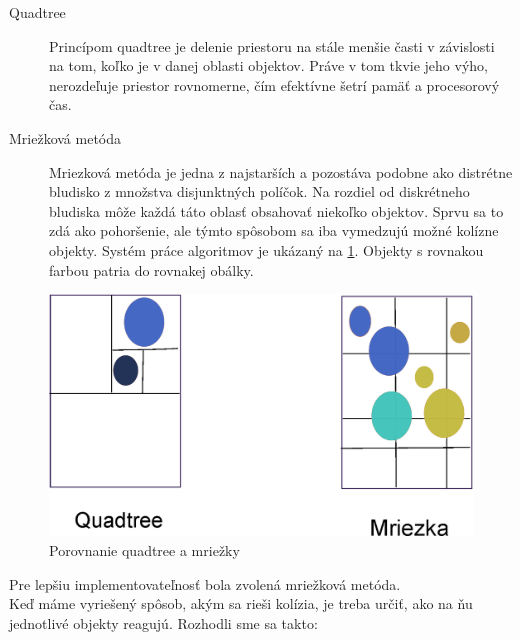 \begin{description} %
\item[Quadtree]
Princípom quadtree\cite{quadtree} je delenie priestoru na stále menšie časti v závislosti na tom, koľko je v danej oblasti objektov. Práve v tom tkvie jeho výho, nerozdeľuje priestor rovnomerne, čím efektívne šetrí pamäť a procesorový čas.
\item[Mriežková metóda]
Mriezková metóda je jedna z najstarších a pozostáva podobne ako distrétne bludisko z množstva disjunktných políčok. Na rozdiel od diskrétneho bludiska môže každá táto oblasť obsahovať niekoľko objektov. Sprvu sa to zdá ako pohoršenie, ale týmto spôsobom sa iba vymedzujú možné kolízne objekty. Systém práce algoritmov je ukázaný na \ref{fig:qtreemriezka}. Objekty s rovnakou farbou patria do rovnakej obálky.
\end{description}
\begin{figure}
\centering
\includegraphics[totalheight=0.2\textheight,width=.5\textwidth]{mriezka}
\caption{Porovnanie quadtree a mriežky}
\label{fig:qtreemriezka}
\end{figure}
Pre lepšiu implementovateľnosť bola zvolená mriežková metóda. \\
Keď máme vyriešený spôsob, akým sa rieši kolízia, je treba určiť, ako na ňu jednotlivé objekty reagujú. Rozhodli sme sa takto:

